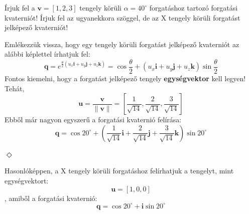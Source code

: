 \begin{execise}
	Írjuk fel a $\mathbf{v}=\left[1,2,3\right]$ tengely körüli $\alpha=40^\circ$ forgatáshoz tartozó forgatási kvaterniót! Írjuk fel az ugyanekkora szöggel, de az X tengely körüli forgatást jelképező kvaterniót!
\end{execise}
\begin{answer}
	Emlékezzük vissza, hogy egy tengely körüli forgatást jelképező kvaterniót az alábbi képlettel írhatjuk fel:
	\begin{equation*}
	\mathbf{q} = e^{\frac{\theta}{2}{(u_x\mathbf{i} + u_y\mathbf{j} + u_z\mathbf{k})}} = \cos \frac{\theta}{2} + (u_x\mathbf{i} + u_y\mathbf{j} + u_z\mathbf{k}) \sin \frac{\theta}{2}
	\end{equation*}
	Fontos kiemelni, hogy a forgatást jelképező tengely \textbf{egységvektor} kell legyen! Tehát,
	\begin{equation*}
	\mathbf{u}=\frac{\mathbf{v}}{\|\mathbf{v}\|}=\left[\frac{1}{\sqrt{14}},\frac{2}{\sqrt{14}},\frac{3}{\sqrt{14}}\right]
	\end{equation*}
	Ebből már nagyon egyszerű a forgatási kvaternió felírása:
	\begin{equation*}
	\mathbf{q} = \cos 20^\circ + (\frac{1}{\sqrt{14}}\mathbf{i} + \frac{2}{\sqrt{14}}\mathbf{j} + \frac{3}{\sqrt{14}}\mathbf{k}) \sin 20^\circ
	\end{equation*}

	\begin{center}
		$\Diamond$
	\end{center}

	Hasonlóképpen, a X tengely körüli forgatáshoz felírhatjuk a tengelyt, mint egységvektort:
	\begin{equation*}
	\mathbf{u}=\left[1,0,0\right]
	\end{equation*}
	, amiből a forgatási kvaternió:
	\begin{equation*}
		\mathbf{q} = \cos 20^\circ + \mathbf{i} \sin 20^\circ
	\end{equation*}
\end{answer}

